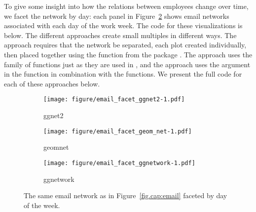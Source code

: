 To give some insight into how the relations between employees change over time, we facet the network by day: each panel in Figure~\ref{fig:email_facet} shows email networks associated with each day of the work week. The code for these visualizations is below. The different approaches create small multiples in different ways. The  approach requires that the network be separated, each plot created individually, then placed together using the  function from the  package \citep{gridextra}. The  approach uses the  family of functions just as they are used in , and the  approach uses the  argument in the  function in combination with the  functions. We present the full code for each of these approaches below. 

\begin{figure}[hbt]
\begin{subfigure}[t]{\textwidth}
\caption{ggnet2}\label{email:ggnet2}
\texttt{[image: figure/email\_facet\_ggnet2-1.pdf]}
\end{subfigure}

\begin{subfigure}[t]{\textwidth}
\caption{geomnet}
\texttt{[image: figure/email\_facet\_geom\_net-1.pdf]}
\end{subfigure}

\begin{subfigure}[t]{\textwidth}
\caption{ggnetwork}
\texttt{[image: figure/email\_facet\_ggnetwork-1.pdf]}
\end{subfigure}

\caption{\label{fig:email_facet} The same email network as in Figure~\ref{fig.cap:email} faceted by day of the week.}
\end{figure}
\afterpage{\clearpage}

